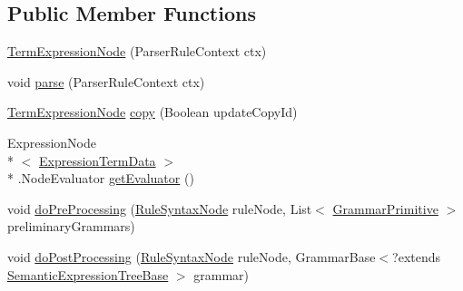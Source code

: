\subsection*{Public Member Functions}
\begin{DoxyCompactItemize}
\item 
\hyperlink{classit_1_1emarolab_1_1cagg_1_1core_1_1language_1_1syntax_1_1expressionTree_1_1expressionNodeType_1_1TermExpressionNode_aa5e98d2c9acbcaa460d60d3265801faf}{Term\-Expression\-Node} (Parser\-Rule\-Context ctx)
\item 
void \hyperlink{classit_1_1emarolab_1_1cagg_1_1core_1_1language_1_1syntax_1_1expressionTree_1_1expressionNodeType_1_1TermExpressionNode_ad4cf7d5c753a7aca37b509737d59b360}{parse} (Parser\-Rule\-Context ctx)
\item 
\hyperlink{classit_1_1emarolab_1_1cagg_1_1core_1_1language_1_1syntax_1_1expressionTree_1_1expressionNodeType_1_1TermExpressionNode}{Term\-Expression\-Node} \hyperlink{classit_1_1emarolab_1_1cagg_1_1core_1_1language_1_1syntax_1_1expressionTree_1_1expressionNodeType_1_1TermExpressionNode_a0abd53c36fac3a3dca5c6896c72946d3}{copy} (Boolean update\-Copy\-Id)
\item 
Expression\-Node\\*
$<$ \hyperlink{classit_1_1emarolab_1_1cagg_1_1core_1_1language_1_1syntax_1_1expressionTree_1_1ExpressionDataFactory_1_1ExpressionTermData}{Expression\-Term\-Data} $>$\\*
.Node\-Evaluator \hyperlink{classit_1_1emarolab_1_1cagg_1_1core_1_1language_1_1syntax_1_1expressionTree_1_1expressionNodeType_1_1TermExpressionNode_a26b19f23f3a5def5b6713863f1049b18}{get\-Evaluator} ()
\item 
void \hyperlink{classit_1_1emarolab_1_1cagg_1_1core_1_1language_1_1syntax_1_1expressionTree_1_1expressionNodeType_1_1TermExpressionNode_a1f0dd2a7dd3f0f3a39eff7f6e42837c1}{do\-Pre\-Processing} (\hyperlink{classit_1_1emarolab_1_1cagg_1_1core_1_1language_1_1syntax_1_1abstractTree_1_1syntaxNodeType_1_1RuleSyntaxNode}{Rule\-Syntax\-Node} rule\-Node, List$<$ \hyperlink{classit_1_1emarolab_1_1cagg_1_1core_1_1language_1_1syntax_1_1GrammarPrimitive}{Grammar\-Primitive} $>$ preliminary\-Grammars)
\item 
void \hyperlink{classit_1_1emarolab_1_1cagg_1_1core_1_1language_1_1syntax_1_1expressionTree_1_1expressionNodeType_1_1TermExpressionNode_a67684eccbe1f91254208f155e4c1d4a2}{do\-Post\-Processing} (\hyperlink{classit_1_1emarolab_1_1cagg_1_1core_1_1language_1_1syntax_1_1abstractTree_1_1syntaxNodeType_1_1RuleSyntaxNode}{Rule\-Syntax\-Node} rule\-Node, Grammar\-Base$<$?extends \hyperlink{interfaceit_1_1emarolab_1_1cagg_1_1core_1_1evaluation_1_1semanticGrammar_1_1syntaxCompiler_1_1SemanticExpressionTreeBase}{Semantic\-Expression\-Tree\-Base} $>$ grammar)
\end{DoxyCompactItemize}
